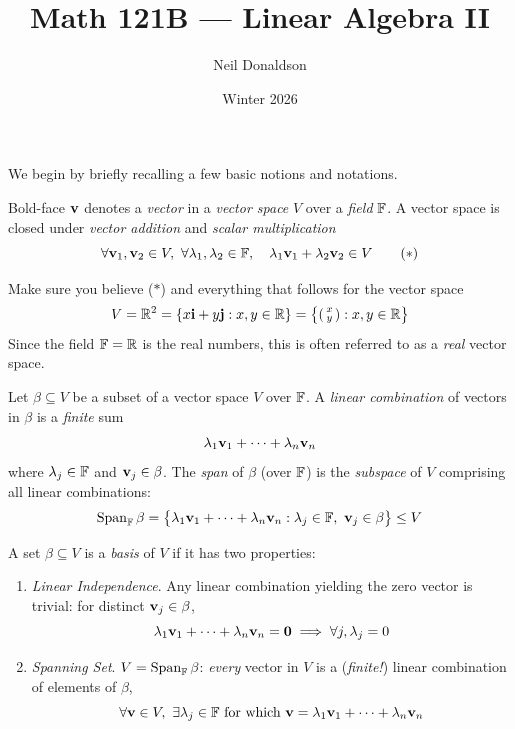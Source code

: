 \thispagestyle{empty}

\title{Math 121B --- Linear Algebra II}
\author{Neil Donaldson}
\date{Winter 2026}
\maketitle 



We begin by briefly recalling a few basic notions and notations.


Bold-face ${\mathbf{v}}$ denotes a \emph{vector} in a \emph{vector space} $V$ over a \emph{field} $\mathbb{F}$. A vector space is closed under \emph{vector addition} and \emph{scalar multiplication}
\[
	\forall {\mathbf{v}}_1,{\mathbf{v}}_2\in V,\ \forall \lambda_1,\lambda_2\in\mathbb{F},\quad \lambda_1{\mathbf{v}}_1+\lambda_2{\mathbf{v}}_2\in V \tag{$\ast$}
\]

\begin{example*}{}
	Make sure you believe ($\ast$) and everything that follows for the vector space 
	\[
		V=\mathbb{R}^2=\{x{\mathbf{i}}+y{\mathbf{j}}:x,y\in\mathbb{R}\} =\bigl\{\left(\begin{smallmatrix}x\\y\end{smallmatrix}\right):x,y\in\mathbb{R}\big\}
	\]
	Since the field $\mathbb{F}=\mathbb{R}$ is the real numbers, this is often referred to as a \emph{real} vector space.
\end{example*}



Let $\beta\subseteq V$ be a subset of a vector space $V$ over $\mathbb{F}$. A \emph{linear combination} of vectors in $\beta$ is a \emph{finite} sum
  \[
  	{\lambda}_1\mathbf{{\mathbf{v}}}_1+\cdots+{\lambda}_{n}\mathbf{{\mathbf{v}}}_{n}
  \]
where $\lambda_j\in\mathbb{F}$ and ${\mathbf{v}}_j\in \beta$. The \emph{span} of $\beta$ (over $\mathbb{F}$) is the \emph{subspace} of $V$ comprising all linear combinations:
\[
	\operatorname{Span}_{\mathbb{F}}\beta =\big\{{\lambda}_1\mathbf{{\mathbf{v}}}_1+\cdots+{\lambda}_{n}\mathbf{{\mathbf{v}}}_{n}:\lambda_j\in\mathbb{F},\ {\mathbf{v}}_j\in \beta\big\} \le V
\]
  
  

A set $\beta\subseteq V$ is a \emph{basis} of $V$ if it has two properties:
\begin{enumerate}
  \item \emph{Linear Independence}. Any linear combination yielding the zero vector is trivial: for distinct ${\mathbf{v}}_j\in \beta$,
  \[
  	{\lambda}_1\mathbf{{\mathbf{v}}}_1+\cdots+{\lambda}_{n}\mathbf{{\mathbf{v}}}_{n}=\mathbf{0}\implies \forall j,\lambda_j=0
  \]
  \item \emph{Spanning Set}. $V=\operatorname{Span}_{\mathbb{F}}\beta$: \emph{every} vector in $V$ is a (\emph{finite!}) linear combination of elements of $\beta$,
  \[
  	\forall{\mathbf{v}}\in V,\ \exists \lambda_j\in\mathbb{F} \text{ for which }{\mathbf{v}}={\lambda}_1\mathbf{{\mathbf{v}}}_1+\cdots+{\lambda}_{n}\mathbf{{\mathbf{v}}}_{n}
  \]
\end{enumerate}
  

